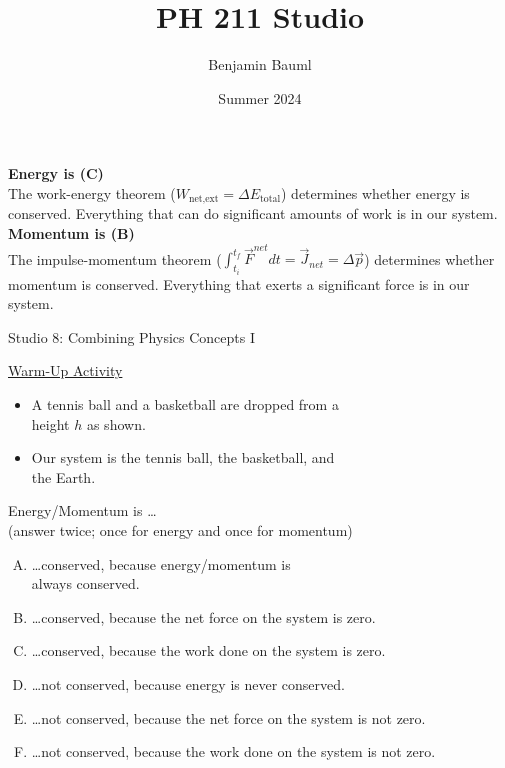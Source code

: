 \documentclass[]{article}
\title{PH 211 Studio \Week}
\author{Benjamin Bauml}
\date{Summer 2024}
\begin{document}
\begin{TeacherMargin}
\noindent\textbf{Energy is (C)} \\
The work-energy theorem ($W_{\text{net,ext}} = \Delta E_{\text{total}}$) determines whether energy is conserved. Everything that can do significant amounts of work is in our system. \\
\textbf{Momentum is (B)} \\
The impulse-momentum theorem ($\int_{t_{i}}^{t_{f}}\vec{F}^{net}dt = \vec{J}_{net} = \Delta\vec{p}$) determines whether momentum is conserved. Everything that exerts a significant force is in our system.
\end{TeacherMargin}
\begin{PresentSpace}
\begin{center}
	\huge Studio 8: Combining Physics Concepts I \\
	\vspace{0.5cm}
\end{center}
\underline{Warm-Up Activity}
\begin{itemize}
	\item A tennis ball and a basketball are dropped from a \\
	height $h$ as shown.
	\item Our system is the tennis ball, the basketball, and \\
	the Earth.
\end{itemize}
Energy/Momentum is \dots \\
(answer twice; once for energy and once for momentum)
\begin{enumerate}[(A)]
	\item \dots conserved, because energy/momentum is \\
	\phantom{\dots}always conserved.
	\item \dots conserved, because the net force on the system is zero.
	\item \dots conserved, because the work done on the system is zero.
	\item \dots not conserved, because energy is never conserved.
	\item \dots not conserved, because the net force on the system is not zero.
	\item \dots not conserved, because the work done on the system is not zero.
\end{enumerate}

\end{PresentSpace}
\end{document}
